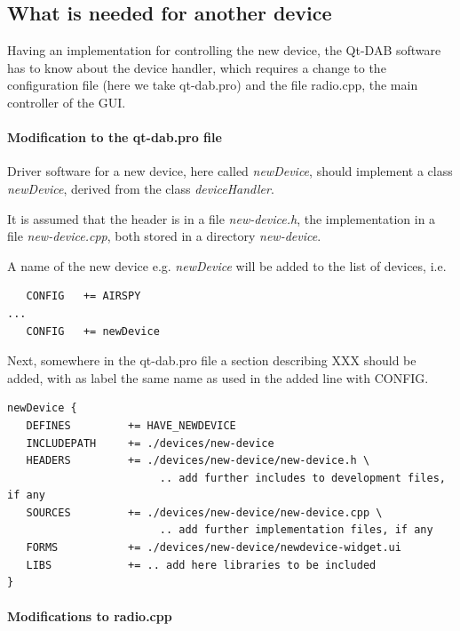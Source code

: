 \documentclass[12pt]{article}
\begin{document}
\subsection{What is needed for another device}
Having an implementation for controlling the new device, the Qt-DAB software
has to know about the device handler, which requires a change to
the configuration file (here we take qt-dab.pro) and
the file radio.cpp, the main controller of the GUI.

\paragraph{Modification to the qt-dab.pro file}
Driver software for a new device, here called {\em newDevice}, should
implement a class {\em newDevice}, derived from the class {\em deviceHandler}.
\par
It is assumed that the header is in a file {\em new-device.h}, the
implementation in a file {\em new-device.cpp}, both stored in a directory
{\em new-device}.
\par
A name of the new device  e.g. {\em newDevice}
will be added to the list of devices, i.e.
{\small
\begin{verbatim}
   CONFIG	+= AIRSPY
...
   CONFIG	+= newDevice
\end{verbatim}
}
Next, somewhere in the qt-dab.pro file a section describing XXX should
be added, with as label the same name as used in the added line with CONFIG.
{\small
\begin{verbatim}
newDevice {
   DEFINES         += HAVE_NEWDEVICE
   INCLUDEPATH     += ./devices/new-device
   HEADERS         += ./devices/new-device/new-device.h \
                        .. add further includes to development files, if any
   SOURCES         += ./devices/new-device/new-device.cpp \
                        .. add further implementation files, if any
   FORMS           += ./devices/new-device/newdevice-widget.ui
   LIBS            += .. add here libraries to be included
}
\end{verbatim}
}

\paragraph{Modifications to radio.cpp}
\end{document}
